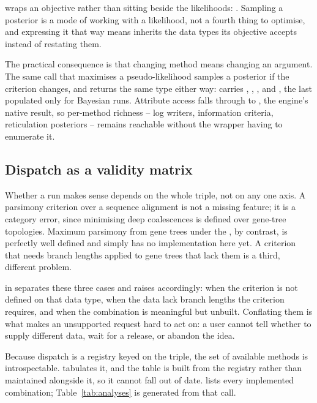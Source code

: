  wraps an objective rather than sitting beside the likelihoods:
. Sampling a posterior is a mode of
working with a likelihood, not a fourth thing to optimise, and expressing it
that way means  inherits the data types its objective accepts
instead of restating them.

The practical consequence is that changing method means changing an argument.
The same call that maximises a pseudo-likelihood samples a posterior if the
criterion changes, and  returns the same type either way:
 carries , , , and
, the last populated only for Bayesian runs. Attribute access
falls through to , the engine's native result, so per-method
richness -- log writers, information criteria, reticulation posteriors --
remains reachable without the wrapper having to enumerate it.

\subsection{Dispatch as a validity matrix}

Whether a run makes sense depends on the whole triple, not on any one axis. A
parsimony criterion over a sequence alignment is not a missing feature; it is a
category error, since minimising deep coalescences is defined over gene-tree
topologies. Maximum parsimony from gene trees under the , by
contrast, is perfectly well defined and simply has no implementation here yet.
A criterion that needs branch lengths applied to gene trees that lack them is a
third, different problem.

 in  separates these three cases and raises
accordingly:  when the criterion is not defined on that data
type,  when the data lack branch lengths the criterion
requires, and  when the combination is meaningful but
unbuilt. Conflating them is what makes an unsupported request hard to act on:
a user cannot tell whether to supply different data, wait for a release, or
abandon the idea.

Because dispatch is a registry keyed on the triple, the set of available
methods is introspectable.  tabulates it, and the table
is built from the registry rather than maintained alongside it, so it cannot
fall out of date.  lists every implemented
combination; Table~\ref{tab:analyses} is generated from that call.

